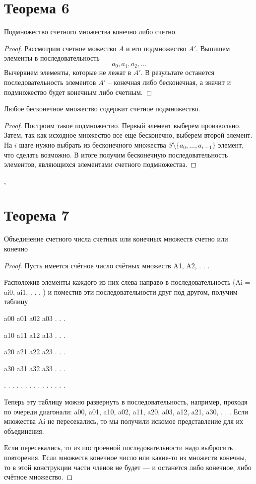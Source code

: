 \documentclass[a4paper,12pt]{article}
\begin{document}
    \section{Теорема 6}
    \begin{theorem}
        Подмножество счетного множества конечно либо счетно. 
    \end{theorem}
    \begin{proof}
        Рассмотрим счетное можество $A$ и его подмножество $A'$. Выпишем элементы в последовательность
        \[
        a_0, a_1, a_2, \ldots
        \]
        Вычеркнем элементы, которые не лежат в $A'$. В результате останется последовательность элементов $A'$ -- конечная либо бесконечная, а значит и подмножество будет конечным либо счетным. 
    \end{proof}
    \begin{theorem}
        Любое бесконечное множество содержит счетное подмножество. 
    \end{theorem}
    \begin{proof}
        Построим такое подмножество. Первый элемент выберем произвольно. Затем, так как исходное множество все еще бесконечно, выберем второй элемент. На $i$ шаге нужно выбрать из бесконечного множества $S \setminus \{a_0, \ldots, a_{i - 1}\}$ элемент, что сделать возможно. В итоге получим бесконечную последовательность элементов, являющихся элементами счетного подмножества.
    \end{proof}
    \sep
    \section {Теорема 7}
    \begin{theorem}
    Объединение счетного числа счетных или конечных множеств счетно или конечно
    \end{theorem}
    \begin{proof}
    
    Пусть имеется счётное число счётных множеств A1, A2, . . .
    
Расположив элементы каждого из них слева направо в последовательность (Ai = {ai0, ai1, . . . }) и поместив эти последовательности друг под другом, получим таблицу

a00 a01 a02 a03 . . .

a10 a11 a12 a13 . . .

a20 a21 a22 a23 . . .

a30 a31 a32 a33 . . .

. . . . . . . . . . . . . . .

Теперь эту таблицу можно развернуть в последовательность, например, проходя по очереди диагонали:
a00, a01, a10, a02, a11, a20, a03, a12, a21, a30, . . .
Если множества Ai не пересекались, то мы получили искомое представление для их объединения. 

Если пересекались, то из построенной последовательности надо выбросить повторения.
Если множеств конечное число или какие-то из множеств конечны, то в этой конструкции части членов не будет — и останется либо конечное, либо счётное множество.
    
    \end{proof}
\end{document}
